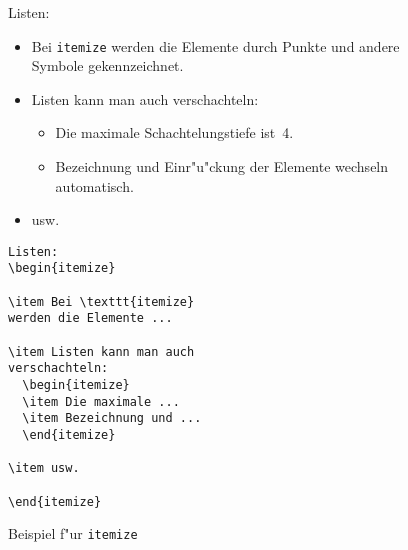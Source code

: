 \begin{figure}[!htbp]
\oben{\textwidth}
\exa
Listen:
\begin{itemize}
\item Bei \texttt{itemize} werden
die Elemente durch Punkte und andere Symbole gekennzeichnet. 
\item Listen kann man auch
verschachteln:
  \begin{itemize}
  \item Die maximale Schachtelungstiefe
  ist~4.
  \item
  Bezeichnung und Ein\-r"u"ckung der Elemente
  wechseln automatisch.
  \end{itemize}
\item usw.
\end{itemize}
\exb
\begin{verbatim}
Listen:
\begin{itemize}
 
\item Bei \texttt{itemize}
werden die Elemente ...
 
\item Listen kann man auch
verschachteln:
  \begin{itemize}
  \item Die maximale ...
  \item Bezeichnung und ...
  \end{itemize}
 
\item usw.
 
\end{itemize}
\end{verbatim}
\exc
\unten
\caption{Beispiel f"ur \texttt{itemize}} \label{item}
\end{figure}


